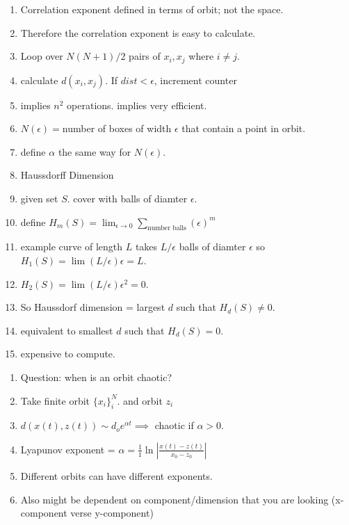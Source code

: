 \documentclass[11pt]{article}
\newcommand{\e}{\epsilon}
\begin{document}
\begin{enumerate}
\begin{enumerate}
                    \item Correlation exponent defined in terms of orbit; not the space. 
                    \item Therefore the correlation exponent is easy to calculate. 
                    \item Loop over $N(N+1)/2$ pairs of $x_i, x_j$ where $i \neq j$. 
                    \item calculate $d(x_i, x_j)$. If $dist < \epsilon$, increment counter
                    \item implies $n^2$ operations. implies very efficient. 
                    \item $N(\epsilon) = $number of boxes of width $\epsilon$ that contain a point in orbit.
                    \item define $\alpha$ the same way for $N(\epsilon)$.
                    \item Haussdorff Dimension
                    \item given set $S$. cover with balls of diamter $\e$. 
                    \item define $H_m(S) = \lim_{\e \to 0} \sum_{\text{number balls}}(\e)^m$
                    \item example curve of length $L$ takes $L/\e$ balls of diamter $\e$ so $H_1(S) = \lim (L/\e) \e = L$. 
                    \item $H_2(S) = \lim (L/\e)\e^2 = 0$.
                    \item So Haussdorf dimension = largest $d$ such that $H_d(S) \neq 0$. 
                    \item equivalent to smallest $d$ such that $H_d(S) = 0$. 
                    \item expensive to compute. 
                \end{enumerate}
                \begin{enumerate}
                    \item Question: when is an orbit chaotic?
                    \item Take finite orbit $\{x_i\}_i^N$.  and orbit $z_i$
                    \item $d(x(t), z(t)) \sim d_o e^{\alpha t} \implies$ chaotic if $\alpha > 0$. 
                    \item Lyapunov exponent = $\alpha = \frac{1}{1} \ln |\frac{x(t) - z(t)}{x_0 - z_0}|$
                    \item Different orbits can have different exponents. 
                    \item Also might be dependent on component/dimension that you are looking (x-component verse y-component)

\end{enumerate}
\end{enumerate}
\end{document}
